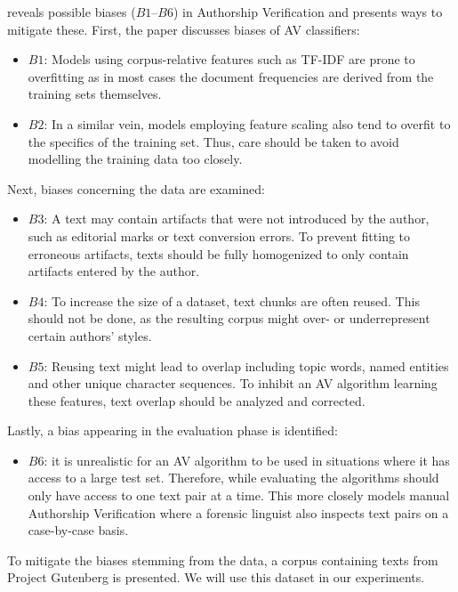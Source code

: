 \cite{stein2019unbiasedGutenbergCorpus} reveals possible biases ($B1$--$B6$) in Authorship Verification and presents ways to mitigate these.
First, the paper discusses biases of AV classifiers:
\begin{itemize}
    \item $B1$: Models using corpus-relative features such as TF-IDF are prone to overfitting as in most cases the document frequencies are derived from the training sets themselves.
    \item $B2$: In a similar vein, models employing feature scaling also tend to overfit to the specifics of the training set.
Thus, care should be taken to avoid modelling the training data too closely.
\end{itemize}
Next, biases concerning the data are examined:
\begin{itemize}
    \item $B3$: A text may contain artifacts that were not introduced by the author, such as editorial marks or text conversion errors.
To prevent fitting to erroneous artifacts, texts should be fully homogenized to only contain artifacts entered by the author.
    \item $B4$: To increase the size of a dataset, text chunks are often reused.
This should not be done, as the resulting corpus might over- or underrepresent certain authors' styles.
    \item $B5$: Reusing text might lead to overlap including topic words, named entities and other unique character sequences.
To inhibit an AV algorithm learning these features, text overlap should be analyzed and corrected.
\end{itemize}
Lastly, a bias appearing in the evaluation phase is identified:
\begin{itemize}
    \item $B6$: it is unrealistic for an AV algorithm to be used in situations where it has access to a large test set.
Therefore, while evaluating the algorithms should only have access to one text pair at a time.
This more closely models manual Authorship Verification where a forensic linguist also inspects text pairs on a case-by-case basis.
\end{itemize}
To mitigate the biases stemming from the data, a corpus containing texts from Project Gutenberg is presented.
We will use this dataset in our experiments.\newline

